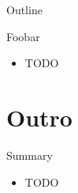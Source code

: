 \begin{frame}{Outline}
  \tableofcontents[current]
\end{frame}

\begin{frame}{Foobar}
  \begin{itemize}
  \item TODO
  \end{itemize}
\end{frame}


\section*{Outro}

\begin{frame}{Summary}
  \begin{itemize}
  \item TODO
  \end{itemize}
\end{frame}


